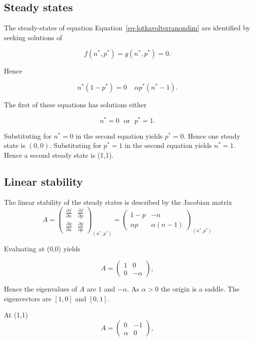 \documentclass[
  letterpaper,
  DIV=11,
  numbers=noendperiod]{scrreprt}
\begin{document}
\subsection{Steady states}\label{steady-states-1}

The steady-states of equation Equation~\ref{eq-lotkavolterranondim} are
identified by seeking solutions of

\[
f(n^*,p^*)=g(n^*,p^*)=0.
\]

Hence

\[
n^*(1-p^*)= 0 \ \ \ \ \ \alpha p^*(n^*-1).
\]

The first of these equations has solutions either

\[
n^*=0 \ \ \  \textrm{or} \ \ \  p^* =1.
\]

Substituting for \(n^*=0\) in the second equation yields \(p^*=0\).
Hence one steady state is \((0,0)\). Substituting for \(p^*=1\) in the
second equation yields \(n^*=1\). Hence a second steady state is (1,1).

\subsection{Linear stability}\label{linear-stability-3}

The linear stability of the steady states is described by the Jacobian
matrix \[
A=\left(\begin{array}{rr}
\frac{\partial f}{\partial n}&\frac{\partial f}{\partial p} \\ \frac{\partial g}{\partial n}&\frac{\partial g}{\partial p} \end{array}\right)_{(n^*,p^*)} = \left(\begin{array}{rr}
1-p&-n \\ \alpha p &\alpha (n-1) \end{array}\right)_{(n^*,p^*)} 
\]

Evaluating at (0,0) yields

\[
A=\left(\begin{array}{rr} 1&0 \\ 0 &-\alpha \end{array}\right),
\]

Hence the eigenvalues of \(A\) are \(1\) and \(-\alpha\). As
\(\alpha>0\) the origin is a saddle. The eigenvectors are \([1, 0]\) and
\([0,1].\)

At (1,1) \[
A=\left(\begin{array}{rr} 0&-1 \\ \alpha &0 \end{array}\right),
\]
\end{document}
